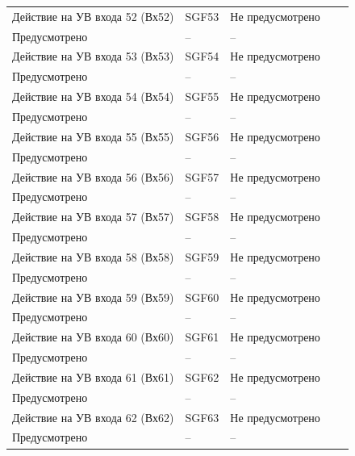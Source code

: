 \begin{longtable}{|>{\centering\arraybackslash}m{5.3cm}|>{\centering\arraybackslash}m{3.3cm}|>{\centering\arraybackslash}m{4.2cm}|>{\centering\arraybackslash}m{1.8cm}|>{\centering\arraybackslash}m{1cm}|}
\hline
\centering Действие на УВ входа 52 (Вх52)  & \centering SGF53 & \centering Не предусмотрено \\ Предусмотрено & \centering -- & \centering \arraybackslash -- \\
\hline
\centering Действие на УВ входа 53 (Вх53)  & \centering SGF54 & \centering Не предусмотрено \\ Предусмотрено & \centering -- & \centering \arraybackslash -- \\
\hline
\centering Действие на УВ входа 54 (Вх54)  & \centering SGF55 & \centering Не предусмотрено \\ Предусмотрено & \centering -- & \centering \arraybackslash -- \\
\hline
\centering Действие на УВ входа 55 (Вх55)  & \centering SGF56 & \centering Не предусмотрено \\ Предусмотрено & \centering -- & \centering \arraybackslash -- \\
\hline
\centering Действие на УВ входа 56 (Вх56)  & \centering SGF57 & \centering Не предусмотрено \\ Предусмотрено & \centering -- & \centering \arraybackslash -- \\
\hline
\centering Действие на УВ входа 57 (Вх57)  & \centering SGF58 & \centering Не предусмотрено \\ Предусмотрено & \centering -- & \centering \arraybackslash -- \\
\hline
\centering Действие на УВ входа 58 (Вх58)  & \centering SGF59 & \centering Не предусмотрено \\ Предусмотрено & \centering -- & \centering \arraybackslash -- \\
\hline
\centering Действие на УВ входа 59 (Вх59)  & \centering SGF60 & \centering Не предусмотрено \\ Предусмотрено & \centering -- & \centering \arraybackslash -- \\
\hline
\centering Действие на УВ входа 60 (Вх60)  & \centering SGF61 & \centering Не предусмотрено \\ Предусмотрено & \centering -- & \centering \arraybackslash -- \\
\hline
\centering Действие на УВ входа 61 (Вх61)  & \centering SGF62 & \centering Не предусмотрено \\ Предусмотрено & \centering -- & \centering \arraybackslash -- \\
\hline
\centering Действие на УВ входа 62 (Вх62)  & \centering SGF63 & \centering Не предусмотрено \\ Предусмотрено & \centering -- & \centering \arraybackslash -- \\

\end{longtable}
